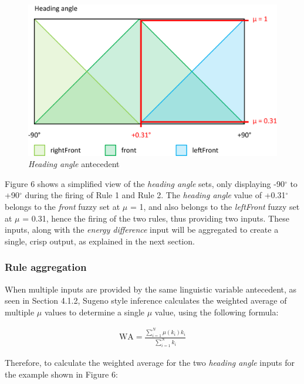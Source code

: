 \begin{figure}[H]
\centering
\caption{\emph{Heading angle} antecedent}
\includegraphics[scale=0.1]{./img/pdf/turnRule_headingAngle.pdf}
\end{figure}

Figure 6 shows a simplified view of the \emph{heading angle} sets, only displaying -90$^{\circ}$ to +90$^{\circ}$ during the firing of Rule 1 and Rule 2. The \emph{heading angle} value of +0.31$^{\circ}$ belongs to the \emph{front} fuzzy set at $\mu$ = 1, and also belongs to the \emph{leftFront} fuzzy set at $\mu$ = 0.31, hence the firing of the two rules, thus providing two inputs. These inputs, along with the \emph{energy difference} input will be aggregated to create a single, crisp output, as explained in the next section.

\subsubsection{Rule aggregation}

When multiple inputs are provided by the same linguistic variable antecedent, as seen in Section 4.1.2, Sugeno style inference calculates the weighted average of multiple $\mu$ values to determine a single $\mu$ value, using the following formula: %

{\LARGE
	\begin{align}
	\mbox{WA} = \frac{\sum^N_{i=1} \mu(k_i) k_i}{\sum^N_{i=1} k_i}
	\end{align}
}

\noindent
Therefore, to calculate the weighted average for the two \emph{heading angle} inputs for the example shown in Figure 6:

